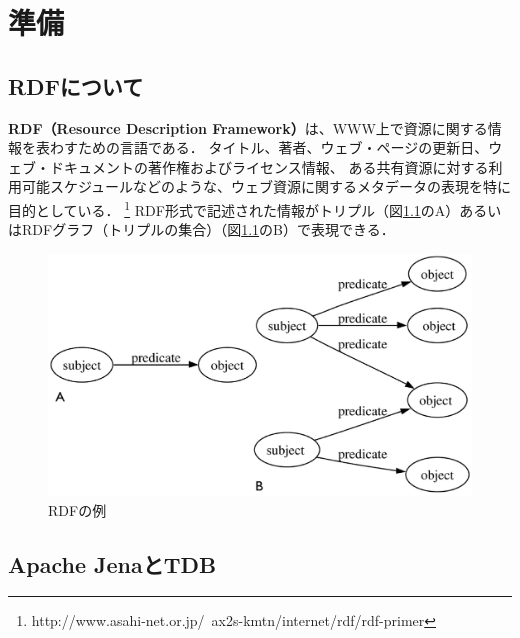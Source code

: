 ﻿%
\chapter{準備}

\section{RDFについて}
\label{knowlegde:rdf}

\textbf{RDF（Resource Description Framework）}は、WWW上で資源に関する情報を表わすための言語である．
タイトル、著者、ウェブ・ページの更新日、ウェブ・ドキュメントの著作権およびライセンス情報、
ある共有資源に対する利用可能スケジュールなどのような、ウェブ資源に関するメタデータの表現を特に目的としている．
\footnote{http://www.asahi-net.or.jp/~ax2s-kmtn/internet/rdf/rdf-primer}
RDF形式で記述された情報がトリプル（図\ref{fig:rdf_triple}のA）あるいはRDFグラフ（トリプルの集合）（図\ref{fig:rdf_triple}のB）で表現できる．

\begin{figure}[h!]
 	\begin{center}
 		\includegraphics[width=160mm]{./images/rdf_sample.eps}
 		\caption{RDFの例}
 		\label{fig:rdf_triple}
 	\end{center}
\end{figure}

\section{Apache JenaとTDB}

